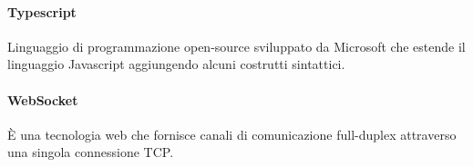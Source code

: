 	\paragraph*{Typescript}
	Linguaggio di programmazione open-source sviluppato da Microsoft che estende il linguaggio Javascript aggiungendo alcuni costrutti sintattici.
	
	\paragraph*{WebSocket}
	È una tecnologia web che fornisce canali di comunicazione full-duplex attraverso una singola connessione TCP.